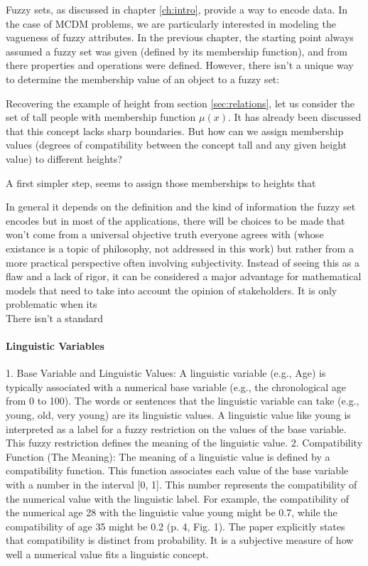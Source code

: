 
Fuzzy sets, as discussed in chapter \ref{ch:intro}, provide a way to encode data. In the case of MCDM  problems, we are particularly interested in modeling the vagueness of fuzzy attributes. In the previous chapter, the starting point always assumed a fuzzy set was given (defined by its membership function), and from there properties and operations were defined. However, there isn't a unique way to determine the membership value of an object to a fuzzy set:

Recovering the example of height from section \ref{sec:relations}, let us consider the set of tall people with membership function $\mu(x)$. It has already been discussed that this concept lacks sharp boundaries. But how can we assign membership values (degrees of compatibility between the concept tall and any given height value) to different heights?

A first simpler step, seems to assign those memberships to heights that 

In general it depends on the definition and the kind of information the fuzzy set encodes but in most of the applications, there will be choices to be made that won't come from a universal objective truth everyone agrees with (whose existance is a topic of philosophy, not addressed in this work) but rather from a more practical perspective often involving subjectivity. Instead of seeing this as a flaw and a lack of rigor, it can be considered a major advantage for mathematical models that need to take into account the opinion of stakeholders. It is only problematic when its  \\

There isn't a standard 

\paragraph{}

\paragraph{Linguistic Variables}
1. Base Variable and Linguistic Values:
A linguistic variable (e.g., Age) is typically associated with a numerical base variable (e.g., the chronological age from 0 to 100).
The words or sentences that the linguistic variable can take (e.g., young, old, very young) are its linguistic values.
A linguistic value like young is interpreted as a label for a fuzzy restriction on the values of the base variable. This fuzzy restriction defines the meaning of the linguistic value.
2. Compatibility Function (The Meaning):
The meaning of a linguistic value is defined by a compatibility function. This function associates each value of the base variable with a number in the interval [0, 1].
This number represents the compatibility of the numerical value with the linguistic label. For example, the compatibility of the numerical age 28 with the linguistic value young might be 0.7, while the compatibility of age 35 might be 0.2 (p. 4, Fig. 1).
The paper explicitly states that compatibility is distinct from probability. It is a subjective measure of how well a numerical value fits a linguistic concept.